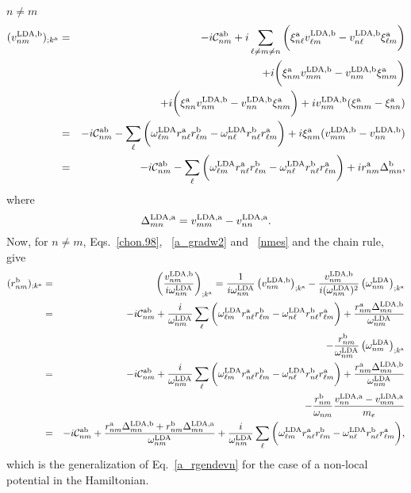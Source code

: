  $n\ne m$
\begin{eqnarray}\label{nmes}
(v^{\mathrm{LDA},\mathrm{b}}_{nm})_{;k^{\mathrm{a}}}&=&
-i{\mathbf{\cal C}}^{\mathrm{a}\mathrm{b}}_{nm}
+i
\sum_{\ell\ne m\ne n}
\bigg(
\xi^{\mathrm{a}}_{n\ell}
v^{\mathrm{LDA},\mathrm{b}}_{\ell m}
-
v^{\mathrm{LDA},\mathrm{b}}_{n\ell}
\xi^{\mathrm{a}}_{\ell m}
\bigg)
\nonumber\\
&&+
i
\bigg(
\xi^{\mathrm{a}}_{nm}
v^{\mathrm{LDA},\mathrm{b}}_{mm}
-
v^{\mathrm{LDA},\mathrm{b}}_{nm}
\xi^{\mathrm{a}}_{mm}
\bigg)
\nonumber\\
&&+
i
\bigg(
\xi^{\mathrm{a}}_{nn}
v^{\mathrm{LDA},\mathrm{b}}_{nm}
-
v^{\mathrm{LDA},\mathrm{b}}_{nn}
\xi^{\mathrm{a}}_{nm}
\bigg)
+i
v^{\mathrm{LDA},\mathrm{b}}_{nm}(\xi^{\mathrm{a}}_{mm}
-
\xi^{\mathrm{a}}_{nn}
)
\nonumber \\
&=&
-i{\mathbf{\cal C}}^{\mathrm{a}\mathrm{b}}_{nm}
-
\sum_{\ell}
\bigg(
\omega^{\mathrm{LDA}}_{\ell m}
r^{\mathrm{a}}_{n\ell}
r^{\mathrm{b}}_{\ell m}
-
\omega^{\mathrm{LDA}}_{n\ell}
r^{\mathrm{b}}_{n\ell}
r^{\mathrm{a}}_{\ell m}
\bigg)
+i
\xi^{\mathrm{a}}_{nm}
(v^{\mathrm{LDA},\mathrm{b}}_{mm}
-
v^{\mathrm{LDA},\mathrm{b}}_{nn}
)
\nonumber \\
&=&
-i{\mathbf{\cal C}}^{\mathrm{a}\mathrm{b}}_{nm}
-
\sum_{\ell}
\bigg(
\omega^{\mathrm{LDA}}_{\ell m} 
r^{\mathrm{a}}_{n\ell} 
r^{\mathrm{b}}_{\ell m}
-
\omega^{\mathrm{LDA}}_{n\ell} 
r^{\mathrm{b}}_{n\ell} 
r^{\mathrm{a}}_{\ell m}
\bigg)
+i 
r^{\mathrm{a}}_{nm}
\Delta^{\mathrm{b}}_{mn}
,
\end{eqnarray} 
where
\begin{equation}\label{na_delta}
\Delta^{\mathrm{LDA},\mathrm{a}}_{mn}=
v^{\mathrm{LDA},\mathrm{a}}_{mm}-v^{\mathrm{LDA},\mathrm{a}}_{nn}
.
\end{equation}
Now, for $n \ne m$, Eqs.~\eqref{chon.98},
~\eqref{a_gradw2} and 
~\eqref{nmes} and the chain rule, give
\begin{eqnarray}\label{na_rgendevn}
(r^{\mathrm{b}}_{nm})_{;k^{\mathrm{a}}}&=&\left(\frac{v^{\mathrm{LDA},\mathrm{b}}_{nm}}{i\omega^{\mathrm{LDA}}_{nm}}\right)_{;k^{\mathrm{a}}}
=
\frac{1}
{i\omega^{\mathrm{LDA}}_{nm}}
\left(
v^{\mathrm{LDA},\mathrm{b}}_{nm}
\right)_{;k^{\mathrm{a}}}
-
\frac{v^{\mathrm{LDA},\mathrm{b}}_{nm}}
{i(\omega^{\mathrm{LDA}}_{nm})^2}
\left(
\omega^{\mathrm{LDA}}_{nm}
\right)_{;k^{\mathrm{a}}}
\nonumber \\
&=&
-i{\mathbf{\cal C}}^{\mathrm{a}\mathrm{b}}_{nm}
+
\frac{i}{\omega^{\mathrm{LDA}}_{nm}}
\sum_{\ell}
\bigg(
\omega^{\mathrm{LDA}}_{\ell m}
r^{\mathrm{a}}_{n\ell}
r^{\mathrm{b}}_{\ell m}
-
\omega^{\mathrm{LDA}}_{n\ell}
r^{\mathrm{b}}_{n\ell}
r^{\mathrm{a}}_{\ell m}
\bigg)
+
\frac{r^{\mathrm{a}}_{nm}
\Delta^{\mathrm{LDA},\mathrm{b}}_{mn}}
{\omega^{\mathrm{LDA}}_{nm}}
\nonumber \\
&&
-
\frac{r^{\mathrm{b}}_{nm}}
{\omega^{\mathrm{LDA}}_{nm}}
\left(
\omega^{\mathrm{LDA}}_{nm}
\right)_{;k^{\mathrm{a}}}
\nonumber \\
&=&
-i{\mathbf{\cal C}}^{\mathrm{a}\mathrm{b}}_{nm}
+
\frac{i}{\omega^{\mathrm{LDA}}_{nm}}
\sum_{\ell}
\bigg(
\omega^{\mathrm{LDA}}_{\ell m}
r^{\mathrm{a}}_{n\ell}
r^{\mathrm{b}}_{\ell m}
-
\omega^{\mathrm{LDA}}_{n\ell}
r^{\mathrm{b}}_{n\ell}
r^{\mathrm{a}}_{\ell m}
\bigg)
+
\frac{r^{\mathrm{a}}_{nm}
\Delta^{\mathrm{LDA},\mathrm{b}}_{mn}}
{\omega^{\mathrm{LDA}}_{nm}}
\nonumber \\
&&
-
\frac{r^{\mathrm{b}}_{nm}}
{\omega_{nm}}
\frac{v^{\mathrm{LDA},\mathrm{a}}_{nn}-v^{\mathrm{LDA},\mathrm{a}}_{mm}}{m_e}
\nonumber \\
&=&
-i{\mathbf{\cal C}}^{\mathrm{a}\mathrm{b}}_{nm}
+
\frac{
r^{\mathrm{a}}_{nm}
\Delta^{\mathrm{LDA},\mathrm{b}}_{mn}
+r^{\mathrm{b}}_{nm}
\Delta^{\mathrm{LDA},\mathrm{a}}_{mn}
}
{\omega^{\mathrm{LDA}}_{nm}}
+
\frac{i}{\omega^{\mathrm{LDA}}_{nm}}
\sum_{\ell}
\bigg(
\omega^{\mathrm{LDA}}_{\ell m}
r^{\mathrm{a}}_{n\ell}
r^{\mathrm{b}}_{\ell m}
-
\omega^{\mathrm{LDA}}_{n\ell}
r^{\mathrm{b}}_{n\ell}
r^{\mathrm{a}}_{\ell m}
\bigg),\nonumber\\
\end{eqnarray}
which is the generalization of Eq.~\eqref{a_rgendevn} for the case of a
non-local potential in the Hamiltonian.
